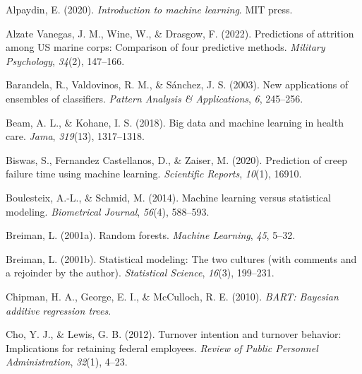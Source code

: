 \documentclass[
  man]{apa7}
\newlength{\cslhangindent}
\newlength{\cslentryspacingunit} %
\newenvironment{CSLReferences}[2] %
 {%
  \setlength{\parindent}{0pt}
  \ifodd #1
  \let\oldpar\par
  \def\par{\hangindent=\cslhangindent\oldpar}
  \fi
  \setlength{\parskip}{#2\cslentryspacingunit}
 }%
 {}
\begin{document}
\begingroup
\setlength{\parindent}{-0.5in}
\setlength{\leftskip}{0.5in}

\hypertarget{refs}{}
\begin{CSLReferences}{1}{0}
\leavevmode{}%
Alpaydin, E. (2020). \emph{Introduction to machine learning}. MIT press.

\leavevmode{}%
Alzate Vanegas, J. M., Wine, W., \& Drasgow, F. (2022). Predictions of attrition among US marine corps: Comparison of four predictive methods. \emph{Military Psychology}, \emph{34}(2), 147--166.

\leavevmode{}%
Barandela, R., Valdovinos, R. M., \& Sánchez, J. S. (2003). New applications of ensembles of classifiers. \emph{Pattern Analysis \& Applications}, \emph{6}, 245--256.

\leavevmode{}%
Beam, A. L., \& Kohane, I. S. (2018). Big data and machine learning in health care. \emph{Jama}, \emph{319}(13), 1317--1318.

\leavevmode{}%
Biswas, S., Fernandez Castellanos, D., \& Zaiser, M. (2020). Prediction of creep failure time using machine learning. \emph{Scientific Reports}, \emph{10}(1), 16910.

\leavevmode{}%
Boulesteix, A.-L., \& Schmid, M. (2014). Machine learning versus statistical modeling. \emph{Biometrical Journal}, \emph{56}(4), 588--593.

\leavevmode{}%
Breiman, L. (2001a). Random forests. \emph{Machine Learning}, \emph{45}, 5--32.

\leavevmode{}%
Breiman, L. (2001b). Statistical modeling: The two cultures (with comments and a rejoinder by the author). \emph{Statistical Science}, \emph{16}(3), 199--231.

\leavevmode{}%
Chipman, H. A., George, E. I., \& McCulloch, R. E. (2010). \emph{BART: Bayesian additive regression trees}.

\leavevmode{}%
Cho, Y. J., \& Lewis, G. B. (2012). Turnover intention and turnover behavior: Implications for retaining federal employees. \emph{Review of Public Personnel Administration}, \emph{32}(1), 4--23.


\end{CSLReferences}
\end{document}
